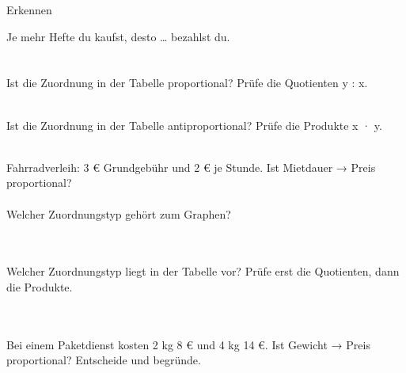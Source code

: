 \begin{aufgabe}{Erkennen}
\begin{teile}
\teil Je mehr Hefte du kaufst, desto … bezahlst du. \\  \\  \\ 
\teil Ist die Zuordnung in der Tabelle proportional? Prüfe die Quotienten y : x. \\  \\ 

\teil Ist die Zuordnung in der Tabelle antiproportional? Prüfe die Produkte x · y. \\  \\ 

\teil Fahrradverleih: 3 € Grundgebühr und 2 € je Stunde. Ist Mietdauer → Preis proportional? \\  \\ 
\teil Welcher Zuordnungstyp gehört zum Graphen? \\  \\  \\ 

\begin{ksys}[xmin=0,xmax=5,ymin=0,ymax=8]\end{ksys}
\teil Welcher Zuordnungstyp liegt in der Tabelle vor? Prüfe erst die Quotienten, dann die Produkte. \\  \\  \\ 

\teil Bei einem Paketdienst kosten 2 kg 8 € und 4 kg 14 €. Ist Gewicht → Preis proportional? Entscheide und begründe.
\end{teile}
\end{aufgabe}

